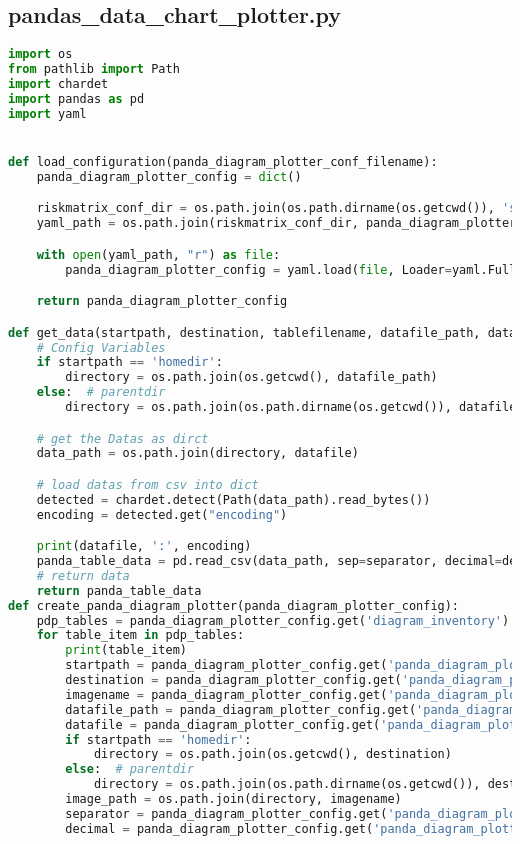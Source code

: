 
\subsection{pandas\_data\_chart\_plotter.py}
\lstset{style=gra_codestyle}
\begin{lstlisting}[language=python, caption=Python LaTex - pandas\_data\_chart\_plotter.py CSV - Diagramm,captionpos=b,label={lst:pandas_data_chart_plotter},breaklines=true]
import os
from pathlib import Path
import chardet
import pandas as pd
import yaml


def load_configuration(panda_diagram_plotter_conf_filename):
    panda_diagram_plotter_config = dict()

    riskmatrix_conf_dir = os.path.join(os.path.dirname(os.getcwd()), 'source', 'configuration')
    yaml_path = os.path.join(riskmatrix_conf_dir, panda_diagram_plotter_conf_filename)

    with open(yaml_path, "r") as file:
        panda_diagram_plotter_config = yaml.load(file, Loader=yaml.FullLoader)

    return panda_diagram_plotter_config

def get_data(startpath, destination, tablefilename, datafile_path, datafile, separator, decimal):
    # Config Variables
    if startpath == 'homedir':
        directory = os.path.join(os.getcwd(), datafile_path)
    else:  # parentdir
        directory = os.path.join(os.path.dirname(os.getcwd()), datafile_path)

    # get the Datas as dirct
    data_path = os.path.join(directory, datafile)

    # load datas from csv into dict
    detected = chardet.detect(Path(data_path).read_bytes())
    encoding = detected.get("encoding")

    print(datafile, ':', encoding)
    panda_table_data = pd.read_csv(data_path, sep=separator, decimal=decimal, encoding=encoding)
    # return data
    return panda_table_data
def create_panda_diagram_plotter(panda_diagram_plotter_config):
    pdp_tables = panda_diagram_plotter_config.get('diagram_inventory')
    for table_item in pdp_tables:
        print(table_item)
        startpath = panda_diagram_plotter_config.get('panda_diagram_plotter').get(table_item).get('startpath')
        destination = panda_diagram_plotter_config.get('panda_diagram_plotter').get(table_item).get('destination_path')
        imagename = panda_diagram_plotter_config.get('panda_diagram_plotter').get(table_item).get('imagename')
        datafile_path = panda_diagram_plotter_config.get('panda_diagram_plotter').get(table_item).get('datafile_path')
        datafile = panda_diagram_plotter_config.get('panda_diagram_plotter').get(table_item).get('datafile')
        if startpath == 'homedir':
            directory = os.path.join(os.getcwd(), destination)
        else:  # parentdir
            directory = os.path.join(os.path.dirname(os.getcwd()), destination)
        image_path = os.path.join(directory, imagename)
        separator = panda_diagram_plotter_config.get('panda_diagram_plotter').get(table_item).get('separator')
        decimal = panda_diagram_plotter_config.get('panda_diagram_plotter').get(table_item).get('decimal')


\end{lstlisting}
